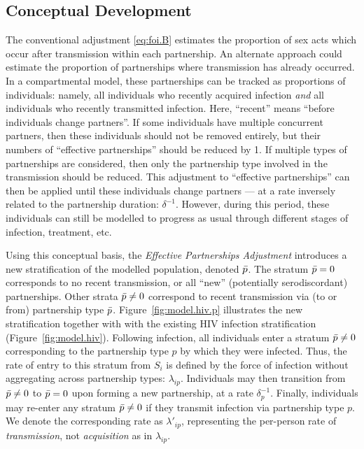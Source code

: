 \subsection{Conceptual Development}\label{mod.foi.concept}
The conventional adjustment \eqref{eq:foi.B} estimates
the proportion of sex acts which occur after transmission within each partnership.
An alternate approach could estimate
the proportion of partnerships where transmission has already occurred.
In a compartmental model, these partnerships can be tracked as proportions of individuals: namely,
all individuals who recently acquired infection \emph{and}
all individuals who recently transmitted infection.
Here, ``recent'' means ``before individuals change partners''.
If some individuals have multiple concurrent partners,
then these individuals should not be removed entirely,
but their numbers of ``effective partnerships'' should be reduced by 1.
If multiple types of partnerships are considered,
then only the partnership type involved in the transmission should be reduced.
This adjustment to ``effective partnerships'' can then be applied
until these individuals change partners
--- at a rate inversely related to the partnership duration: $\delta^{-1}$.
However, during this period, these individuals can still be modelled
to progress as usual through different stages of infection, treatment, etc.
\par
Using this conceptual basis, the \emph{Effective Partnerships Adjustment}
introduces a new stratification of the modelled population, denoted $\bar{p}$.
The stratum $\bar{p} = 0$ corresponds to no recent transmission,
or all ``new'' (potentially serodiscordant) partnerships.
Other strata $\bar{p} \ne 0$ correspond to recent transmission via (to or from) partnership type $\bar{p}$.
Figure~\ref{fig:model.hiv.p} illustrates the new stratification
together with with the existing HIV infection stratification (Figure~\ref{fig:model.hiv}).
Following infection, all individuals enter a stratum $\bar{p} \ne 0$
corresponding to the partnership type $p$ by which they were infected.
Thus, the rate of entry to this stratum from $S_i$ is defined by
the force of infection without aggregating across partnership types: $\lambda_{ip}$.
Individuals may then transition from $\bar{p} \ne 0$ to $\bar{p} = 0$
upon forming a new partnership, at a rate $\delta_p^{-1}$.
Finally, individuals may re-enter any stratum $\bar{p} \ne 0$
if they transmit infection via partnership type $p$.
We denote the corresponding rate as $\lambda'_{ip}$,
representing the per-person rate of \emph{transmission},
not \emph{acquisition} as in $\lambda_{ip}$.
